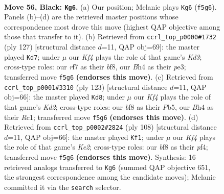 \documentclass[11pt]{article}
\begin{document}
\clearpage

\begin{figure}[p]\centering
\begin{subfigure}{0.46\textwidth}\centering
\resizebox{\linewidth}{!}{%
\newchessgame
\chessboard[
  setfen={5B2/5R2/P7/1P3k2/3K3b/8/8/8 b - - 2 56},
  showmover=false,
  pgfstyle=straightmove, color=movearrow, markmove={f5-g6}
]}
\caption{}
\end{subfigure}\hfill
\begin{subfigure}{0.46\textwidth}\centering
\resizebox{\linewidth}{!}{%
\newchessgame
\chessboard[
  setfen={5B2/8/3k4/5K1b/8/1p2P3/1P6/8 b - - 4 64},
  showmover=false,
  pgfstyle=straightmove, color=movearrow, markmove={d6-d7}
]}
\caption{}
\end{subfigure}
\\[4pt]
\begin{subfigure}{0.46\textwidth}\centering
\resizebox{\linewidth}{!}{%
\newchessgame
\chessboard[
  setfen={8/3k1R2/8/1p3P2/8/8/5K2/2r5 b - - 8 62},
  showmover=false,
  pgfstyle=straightmove, color=movearrow, markmove={d7-d8}
]}
\caption{}
\end{subfigure}\hfill
\begin{subfigure}{0.46\textwidth}\centering
\resizebox{\linewidth}{!}{%
\newchessgame
\chessboard[
  setfen={8/8/P5k1/8/3B1p2/8/4K1r1/8 w - - 4 55},
  showmover=false,
  pgfstyle=straightmove, color=movearrow, markmove={e2-f1}
]}
\caption{}
\end{subfigure}
\caption{\textbf{Move 56, Black: \texttt{Kg6}.} (a) Our position; Melanie plays \texttt{Kg6} (\texttt{f5g6}). Panels (b)--(d) are the retrieved master positions whose correspondence most drove this move (highest QAP objective among those that transfer to it). (b) Retrieved from \texttt{ccrl\_top\_p0000\#1732} (ply 127) [structural distance $d$=11, QAP obj=69]: the master played \texttt{Kd7}; under $\mu$ our \emph{Kf4} plays the role of that game's \emph{Kd3}; cross-type roles: our \emph{r}f7 as their \emph{b}f8, our \emph{B}h4 as their \emph{p}e3; transferred move \texttt{f5g6} \textbf{(endorses this move)}. (c) Retrieved from \texttt{ccrl\_top\_p0001\#3310} (ply 123) [structural distance $d$=11, QAP obj=66]: the master played \texttt{Kd8}; under $\mu$ our \emph{Kf4} plays the role of that game's \emph{Kd2}; cross-type roles: our \emph{b}f8 as their \emph{P}b5, our \emph{B}h4 as their \emph{R}c1; transferred move \texttt{f5g6} \textbf{(endorses this move)}. (d) Retrieved from \texttt{ccrl\_top\_p0002\#2824} (ply 108) [structural distance $d$=11, QAP obj=66]: the master played \texttt{Kf1}; under $\mu$ our \emph{Kf4} plays the role of that game's \emph{Ke2}; cross-type roles: our \emph{b}f8 as their \emph{p}f4; transferred move \texttt{f5g6} \textbf{(endorses this move)}. Synthesis: 16 retrieved analogs transferred to \texttt{Kg6} (summed QAP objective 651, the strongest correspondence among the candidate moves); Melanie committed it via the \texttt{search} selector.}
\label{fig:thought-m111}
\end{figure}
\end{document}
